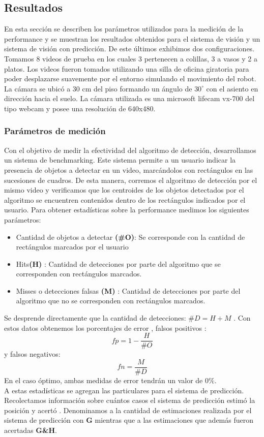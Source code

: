 	
	
\subsection{Resultados}
En esta sección se describen los parámetros utilizados para la 
medición de la performance y se muestran los resultados obtenidos para 
el sistema de visión y un sistema de visión con predicción. De este 
últimos exhibimos dos configuraciones. Tomamos 8 videos de prueba en los cuales 3 pertenecen a 
colillas, 3 a vasos y 2 a platos. Los videos fueron tomados utilizando 
una silla de oficina giratoria para poder desplazarse suavemente por 
el entorno simulando el movimiento del robot. La cámara se ubicó a 30 
cm del piso formando un ángulo de $30^{\circ}$ con el asiento  en dirección 
hacia el suelo. La cámara utilizada es una microsoft lifecam vx-700 del tipo webcam y posee una 
resolución de 640x480.

\subsubsection{Parámetros de medición}
Con el objetivo de  medir la efectividad del algoritmo de detección, desarrollamos un sistema de benchmarking. Este sistema permite
a un usuario indicar la presencia de objetos a detectar en un video, marcándolos con rectángulos en las sucesiones de cuadros. De esta
manera, corremos el algoritmo de detección por el mismo video y verificamos que los centroides de los objetos detectados por el algoritmo 
se encuentren contenidos dentro de los rectángulos indicados por el 
usuario. Para obtener estadísticas sobre la performance  
medimos los siguientes parámetros:
\begin{itemize}
\item { Cantidad de objetos a detectar \textbf{(\#O)}: Se corresponde con la cantidad de rectángulos marcados por el usuario}
\item { Hits\textbf{(H)} : Cantidad de detecciones por parte del algoritmo que se corresponden con rectángulos marcados.}
\item { Misses o detecciones falsas \textbf{(M)} : Cantidad de detecciones por parte del algoritmo que no se corresponden con rectángulos marcados.}
\end{itemize}
Se desprende directamente que la cantidad de detecciones: 
\textbf{$\#D=H+M$} .
Con estos datos obtenemos los porcentajes de error , falsos positivos : 
\[
	fp=1 - \frac{H}{\# O}
\]
y falsos negativos:
\[
	fn=\frac{M}{\# D}
\]
En el caso óptimo, ambas medidas de error tendrán un valor de $0\%$.  \\
\indent A estas estadísticas se agregan las particulares para el sistema de predicción. Recolectamos información sobre
cuántos casos el sistema de predicción estimó la posición y acertó . Denominamos
a la cantidad de estimaciones realizada por el sistema de predicción 
con \textbf{G} mientras que a las estimaciones que además fueron 
acertadas \textbf{G\&H}.

